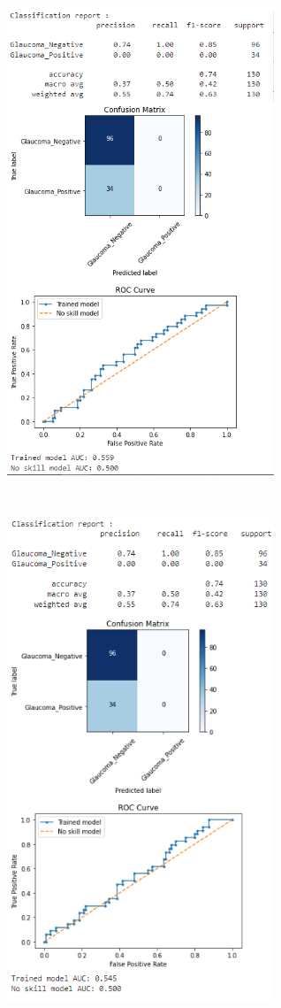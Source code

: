 \documentclass[11pt, a4paper]{article}
\begin{document}
\begin{figure}[H]
\centering
\begin{minipage}{.5\textwidth}
  \centering
  \includegraphics[width=8cm, height=15cm]{imgs/results/results-vgg16-ft.PNG}
  \label{fig:results-vgg16-ft}
\end{minipage}%
\begin{minipage}{.5\textwidth}
  \centering
  \includegraphics[width=8cm, height=15cm]{imgs/results/results-resnet50-ft.PNG} 

\end{minipage}
\end{figure}
\end{document}
